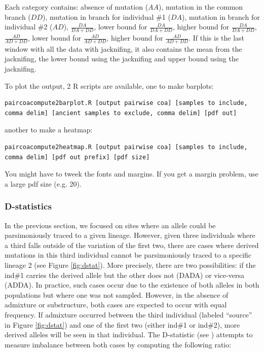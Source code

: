 \documentclass[a4paper]{article}
\begin{document}
Each category contains: absence of mutation ($AA$), mutation in the common branch ($DD$), mutation in branch for individual \#1 ($DA$), mutation in branch for individual \#2 ($AD$), $\frac { DA} { DA+DD }$, lower bound for $\frac { DA} { DA+DD }$, higher bound for $\frac { DA} { DA+DD }$, $\frac { AD} { AD+DD }$, lower bound for $\frac { AD} { AD+DD }$, higher bound for $\frac { AD} { AD+DD }$. If this is the last window with all the data with jacknifing, it also contains the mean from the jacknifing, the lower bound using the jacknifing and upper bound using the jacknifing.


To plot the output, 2 R scripts are available, one to make barplots:

\begin{lstlisting}
paircoacompute2barplot.R [output pairwise coa] [samples to include, comma delim] [ancient samples to exclude, comma delim] [pdf out]
\end{lstlisting}

another to make a heatmap:
\begin{lstlisting}
paircoacompute2heatmap.R [output pairwise coa] [samples to include, comma delim] [pdf out prefix] [pdf size]
\end{lstlisting}

You might have to tweek the fonts and margins. If you get a margin problem, use a large pdf size (e.g. 20).


\subsubsection{D-statistics}


In the previous section, we focused on sites where an allele could be parsimoniously traced to a given lineage. However, given three individuals where a third falls outside of the variation of the first two, there are cases where derived mutations in this third individual cannot be parsimoniously traced to a specific lineage 2 (see Figure \ref{fig:dstat}). More precisely, there are two possibilities: if the ind\#1 carries the derived allele but the other does not (DADA) or vice-versa (ADDA). In practice, such cases occur due to the existence of both alleles in both populations but where one was not sampled. However, in the absence of admixture or substructure, both cases are expected to occur with equal frequency. If admixture occurred between the third individual (labeled ``source'' in Figure \ref{fig:dstat}) and one of the first two (either ind\#1 or ind\#2), more derived alleles will be seen in that individual. The D-statistic (see \cite{patterson2012ancient}) attempts to measure imbalance between both cases by computing the following ratio:
\end{document}
